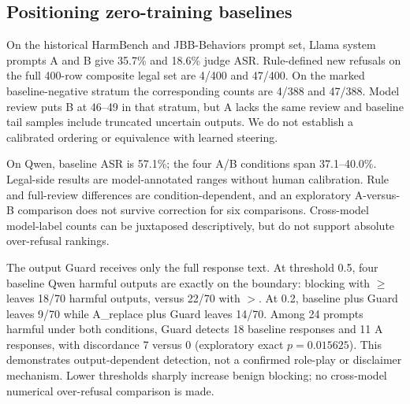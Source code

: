 \subsection{Positioning zero-training baselines}


On the historical HarmBench and JBB-Behaviors prompt set, Llama system prompts A and B give 35.7\% and 18.6\% judge ASR. Rule-defined new refusals on the full 400-row composite legal set are 4/400 and 47/400. On the marked baseline-negative stratum the corresponding counts are 4/388 and 47/388. Model review puts B at 46--49 in that stratum, but A lacks the same review and baseline tail samples include truncated uncertain outputs. We do not establish a calibrated ordering or equivalence with learned steering.

On Qwen, baseline ASR is 57.1\%; the four A/B conditions span 37.1--40.0\%. Legal-side results are model-annotated ranges without human calibration. Rule and full-review differences are condition-dependent, and an exploratory A-versus-B comparison does not survive correction for six comparisons. Cross-model model-label counts can be juxtaposed descriptively, but do not support absolute over-refusal rankings.

The output Guard receives only the full response text. At threshold 0.5, four baseline Qwen harmful outputs are exactly on the boundary: blocking with $\geq$ leaves 18/70 harmful outputs, versus 22/70 with $>$. At 0.2, baseline plus Guard leaves 9/70 while A\_replace plus Guard leaves 14/70. Among 24 prompts harmful under both conditions, Guard detects 18 baseline responses and 11 A responses, with discordance 7 versus 0 (exploratory exact $p=0.015625$). This demonstrates output-dependent detection, not a confirmed role-play or disclaimer mechanism. Lower thresholds sharply increase benign blocking; no cross-model numerical over-refusal comparison is made.


